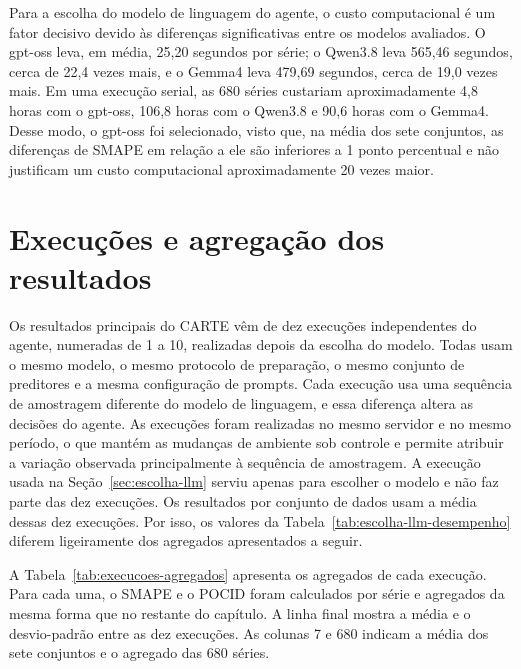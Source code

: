 Para a escolha do modelo de linguagem do agente, o custo computacional é um fator decisivo devido às diferenças significativas entre os modelos avaliados. O gpt-oss leva, em média, 25,20 segundos por série; o Qwen3.8 leva 565,46 segundos, cerca de 22,4 vezes mais, e o Gemma4 leva 479,69 segundos, cerca de 19,0 vezes mais. Em uma execução serial, as 680 séries custariam aproximadamente 4,8 horas com o gpt-oss, 106,8 horas com o Qwen3.8 e 90,6 horas com o Gemma4. Desse modo, o gpt-oss foi selecionado, visto que, na média dos sete conjuntos, as diferenças de SMAPE em relação a ele são inferiores a 1 ponto percentual e não justificam um custo computacional aproximadamente 20 vezes maior.

\section{Execuções e agregação dos resultados} \label{sec:execucoes}

Os resultados principais do CARTE vêm de dez execuções independentes do agente, numeradas de 1 a 10, realizadas depois da escolha do modelo. Todas usam o mesmo modelo, o mesmo protocolo de preparação, o mesmo conjunto de preditores e a mesma configuração de prompts. Cada execução usa uma sequência de amostragem diferente do modelo de linguagem, e essa diferença altera as decisões do agente. As execuções foram realizadas no mesmo servidor e no mesmo período, o que mantém as mudanças de ambiente sob controle e permite atribuir a variação observada principalmente à sequência de amostragem. A execução usada na Seção~\ref{sec:escolha-llm} serviu apenas para escolher o modelo e não faz parte das dez execuções. Os resultados por conjunto de dados usam a média dessas dez execuções. Por isso, os valores da Tabela~\ref{tab:escolha-llm-desempenho} diferem ligeiramente dos agregados apresentados a seguir.

A Tabela~\ref{tab:execucoes-agregados} apresenta os agregados de cada execução. Para cada uma, o SMAPE e o POCID foram calculados por série e agregados da mesma forma que no restante do capítulo. A linha final mostra a média e o desvio-padrão entre as dez execuções. As colunas 7 e 680 indicam a média dos sete conjuntos e o agregado das 680 séries.

